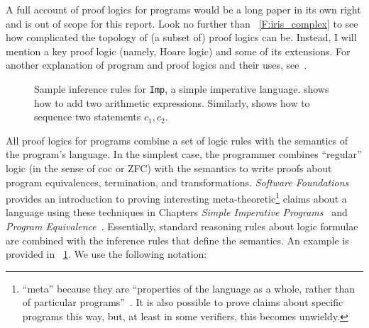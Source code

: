 A full account of proof logics for programs would be a long paper in its own
right and is out of scope for this report. Look no further than
\figurename~\ref{F:iris_complex} to see how complicated the topology of (a
subset of) proof logics can be. Instead, I will mention a key proof logic
(namely, Hoare logic) and some of its extensions. For another explanation of
program and proof logics and their uses, see~\cite[\S 5]{Appel_2011}.

\begin{figure}[ht]
    \centering
    \caption{Sample inference rules for \texttt{Imp}, a simple imperative
    language.  shows how to add two arithmetic expressions.
    Similarly,  shows how to sequence two statements \(c_1,
    c_2\).}\label{F:Imp_ex}
\end{figure}

All proof logics for programs combine a set of logic rules with the semantics of
the program's language. In the simplest case, the programmer combines
``regular'' logic (in the sense of \gls{coc} or ZFC) with the semantics to write
proofs about program equivalences, termination, and transformations.
\emph{Software Foundations} provides an introduction to proving interesting
meta-theoretic\footnote{``meta'' because they are ``properties of the language
as a whole, rather than of particular programs''~\cite{Pierce:SF2}. It is also
possible to prove claims about specific programs this way, but, at least in some
verifiers, this becomes unwieldy.} claims about a language using these
techniques in Chapters \emph{Simple Imperative Programs}~\cite{Pierce:SF1} and
\emph{Program Equivalence}~\cite{Pierce:SF2}. Essentially, standard reasoning
rules about logic formulae are combined with the inference rules that define the
semantics. An example is provided in \figurename~\ref{F:Imp_ex}. We use the
following notation:

